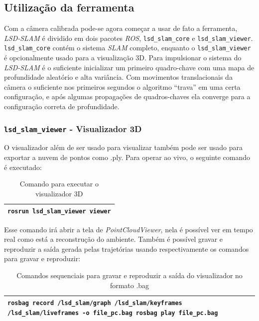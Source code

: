 \subsection{Utilização da ferramenta}

Com a câmera calibrada pode-se agora começar a usar de fato a ferramenta, \textit{LSD-SLAM} é dividido em dois pacotes \textit{ROS}, \texttt{lsd\_slam\_core} e \texttt{lsd\_slam\_viewer}. \texttt{lsd\_slam\_core} contém o sistema \textit{SLAM} completo, enquanto o \texttt{lsd\_slam\_viewer} é opcionalmente usado para a visualização 3D.
Para impulsionar o sistema do \textit{LSD-SLAM} é o suficiente inicializar um primeiro quadro-chave com uma mapa de profundidade aleatório e alta variância. Com movimentos translacionais da câmera o suficiente nos primeiros segundos o algoritmo “trava” em uma certa configuração, e após algumas propagações de quadros-chaves ela converge para a configuração correta de profundidade.

\subsubsection{\texttt{lsd\_slam\_viewer} - Visualizador 3D}

O visualizador além de ser usado para visualizar também pode ser usado para exportar a nuvem de pontos como .ply. Para operar ao vivo, o seguinte comando é executado:

\begin{table}[!ht]\label{tb:12}
\begin{tabular}{| p{\textwidth}|}
\hline
\texttt{rosrun lsd\_slam\_viewer viewer}\\
\hline
\end{tabular}
\caption{Comando para executar o visualizador 3D}
\end{table}

Esse comando irá abrir a tela de \textit{PointCloudViewer}, nela é possível ver em tempo real como está a reconstrução do ambiente. Também é possível gravar e reproduzir a saída gerada pelas trajetórias usando respectivamente os comandos para gravar e reproduzir:

\begin{table}[!ht]\label{tb:13}
\begin{tabular}{| p{\textwidth}|}
\hline
\texttt{rosbag record /lsd\_slam/graph /lsd\_slam/keyframes /lsd\_slam/liveframes -o file\_pc.bag
rosbag play file\_pc.bag}\\
\hline
\end{tabular}
\caption{Comandos sequenciais para gravar e reproduzir a saída do visualizador no formato .bag}
\end{table}

